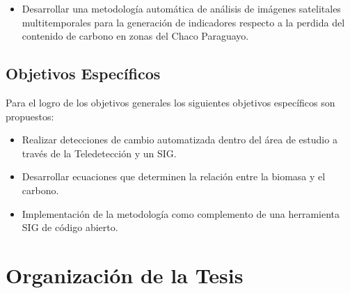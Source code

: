 \begin{itemize}
\item Desarrollar una metodolog\'ia autom\'atica de an\'alisis de im\'agenes satelitales multitemporales para la generaci\'on de indicadores respecto a la perdida del contenido de carbono en zonas del Chaco Paraguayo.
\end{itemize}
\subsection{Objetivos Específicos}
Para el logro de los objetivos generales los siguientes objetivos específicos son propuestos:
\begin{itemize}


\item Realizar detecciones de cambio automatizada dentro del \'area de estudio a trav\'es de la Teledetecci\'on y un SIG.   

\item Desarrollar ecuaciones que determinen la relación entre la biomasa y el carbono.
    
\item Implementaci\'on de la metodolog\'ia como complemento de una herramienta SIG de c\'odigo abierto.


\end{itemize}



\section{Organización de la Tesis}


